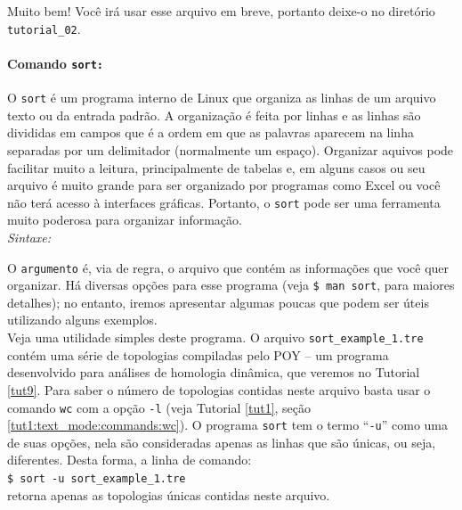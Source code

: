 \begin{refsection}
Muito bem! Você irá usar esse arquivo em breve, portanto deixe-o no diretório \texttt{tutorial\_02}.\\

\paragraph{Comando \texttt{sort:}}\label{tut2:text:editors:texttools:sort}
O \texttt{sort} é um programa interno de Linux que organiza as linhas de um arquivo texto ou da entrada padrão. A organização é feita por linhas e as linhas são divididas em campos que é a ordem em que as palavras aparecem na linha separadas por um delimitador (normalmente um espaço). Organizar aquivos pode facilitar muito a leitura, principalmente de tabelas e, em alguns casos ou seu arquivo é muito grande para ser organizado por programas como Excel ou você não terá acesso à interfaces gráficas. Portanto, o \texttt{sort} pode ser uma ferramenta muito poderosa para organizar informação.\\

\textit{Sintaxe:}\\

O \texttt{argumento} é, via de regra, o arquivo que contém as informações que você quer organizar. Há diversas opções para esse programa (veja \texttt{\$ man sort}, para maiores detalhes); no entanto, iremos apresentar algumas poucas que podem ser úteis utilizando alguns exemplos.\\

Veja uma utilidade simples deste programa. O arquivo \texttt{sort\_example\_1.tre} contém uma série de topologias compiladas pelo POY \parencite[][]{VaronETAL_2010, VaronETAL_2014} -- um programa desenvolvido para análises de homologia dinâmica, que veremos no Tutorial \ref{tut9}. Para saber o número de topologias contidas neste arquivo basta usar o comando \texttt{wc} com a opção \texttt{-l} (veja Tutorial \ref{tut1}, seção \ref{tut1:text_mode:commands:wc}). O programa \texttt{sort} tem o termo ``\texttt{-u}'' como uma de suas opções, nela são consideradas apenas as linhas que são únicas, ou seja, diferentes. Desta forma, a linha de comando:\\

\texttt{\$ sort -u sort\_example\_1.tre}\\

retorna apenas as topologias únicas contidas neste arquivo. \\


\end{refsection}
